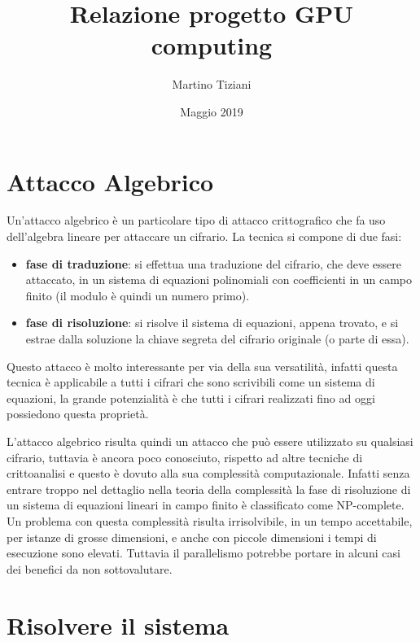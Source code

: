 \documentclass{article}
\title{Relazione progetto GPU computing}
\author{Martino Tiziani}
\date{Maggio 2019}
\begin{document}
\maketitle

\section{Attacco Algebrico}

Un'attacco algebrico è un particolare tipo di attacco crittografico che fa uso dell'algebra lineare per attaccare un cifrario. La tecnica si compone di due fasi:

\begin{itemize}
\item \textbf{fase di traduzione}: si effettua una traduzione del cifrario, che deve essere attaccato, in un sistema di equazioni polinomiali con coefficienti in un campo finito (il modulo è quindi un numero primo).

\item \textbf{fase di risoluzione}: si risolve il sistema di equazioni, appena trovato, e si estrae dalla soluzione la chiave segreta del cifrario originale (o parte di essa).

\end{itemize}

Questo attacco è molto interessante per via della sua versatilità, infatti questa tecnica è applicabile a tutti i cifrari che sono scrivibili come un sistema di equazioni, la grande potenzialità è che tutti i cifrari realizzati fino ad oggi possiedono questa proprietà. 

L'attacco algebrico risulta quindi un attacco che può essere utilizzato su qualsiasi cifrario, tuttavia è ancora poco conosciuto, rispetto ad altre tecniche di crittoanalisi e questo è dovuto alla sua complessità computazionale. Infatti senza entrare troppo nel dettaglio nella teoria della complessità la fase di risoluzione di un sistema di equazioni lineari in campo finito è classificato come NP-complete. Un problema con questa complessità risulta irrisolvibile, in un tempo accettabile, per istanze di grosse dimensioni, e anche con piccole dimensioni i tempi di esecuzione sono elevati. Tuttavia il parallelismo potrebbe portare in alcuni casi dei benefici da non sottovalutare.

\section{Risolvere il sistema}
\end{document}
